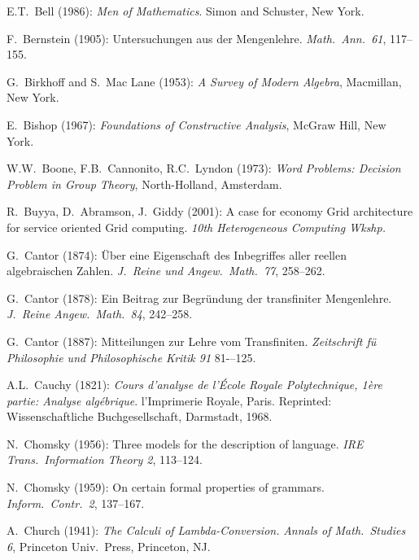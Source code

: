 
\begin{thebibliography}{999}




E.T.~Bell (1986):
{\it Men of Mathematics}.
Simon and Schuster, New York.

F.~Bernstein (1905): Untersuchungen aus der Mengenlehre. {\it
Math.~Ann.~61}, 117--155.

G.~Birkhoff and S.~Mac Lane (1953): {\it A Survey of Modern Algebra},
Macmillan, New York.

E.~Bishop (1967): {\it Foundations of Constructive Analysis},
McGraw Hill, New York.

W.W.~Boone, F.B.~Cannonito, R.C.~Lyndon (1973):
{\it Word Problems: Decision Problem in Group Theory}, North-Holland,
Amsterdam.

R.~Buyya, D.~Abramson, J.~Giddy (2001): A case for economy Grid
architecture for service oriented Grid computing.  {\it 10th
Heterogeneous Computing Wkshp.}


G.~Cantor (1874): \"{U}ber eine Eigenschaft des Inbegriffes aller
reellen algebraischen Zahlen.  {\it J.~Reine und Angew.~Math.~77},
258--262.

G.~Cantor (1878): Ein Beitrag zur Begr\"{u}ndung der transfiniter
Mengenlehre.  {\it J.~Reine Angew.~Math.~84}, 242--258.

G.~Cantor (1887): Mitteilungen zur Lehre vom Transfiniten.
{\it Zeitschrift f\"{u} Philosophie und Philosophische Kritik 91}
81-–125.

A.L.~Cauchy (1821): {\it Cours d'analyse de l'\'{E}cole Royale
Polytechnique, 1\`{e}re partie: Analyse alg\'{e}brique}.
l'Imprimerie Royale, Paris.  Reprinted: Wissenschaftliche
Buchgesellschaft, Darmstadt, 1968.

N.~Chomsky (1956): Three models for the description of language.
{\it IRE Trans.~Information Theory 2}, 113--124.

N.~Chomsky (1959): On certain formal properties of grammars.  {\it
Inform.~Contr.~2}, 137--167.

A.~Church (1941):
{\it The Calculi of Lambda-Conversion.}
{\it Annals of Math.~Studies 6}, Princeton Univ.~Press, Princeton, NJ.


\end{thebibliography}
